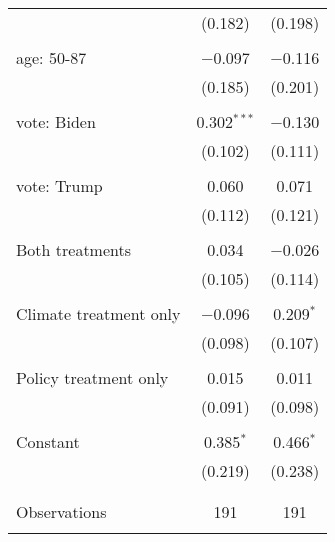 \begin{tabular}{@{\extracolsep{5pt}}lcc}
  & (0.182) & (0.198) \\ 
  & & \\ 
 age: 50-87 & $-$0.097 & $-$0.116 \\ 
  & (0.185) & (0.201) \\ 
  & & \\ 
 vote: Biden & 0.302$^{***}$ & $-$0.130 \\ 
  & (0.102) & (0.111) \\ 
  & & \\ 
 vote: Trump & 0.060 & 0.071 \\ 
  & (0.112) & (0.121) \\ 
  & & \\ 
 Both treatments & 0.034 & $-$0.026 \\ 
  & (0.105) & (0.114) \\ 
  & & \\ 
 Climate treatment only & $-$0.096 & 0.209$^{*}$ \\ 
  & (0.098) & (0.107) \\ 
  & & \\ 
 Policy treatment only & 0.015 & 0.011 \\ 
  & (0.091) & (0.098) \\ 
  & & \\ 
 Constant & 0.385$^{*}$ & 0.466$^{*}$ \\ 
  & (0.219) & (0.238) \\ 
  & & \\ 
\hline \\[-1.8ex] 

Observations & 191 & 191 \\ 
\hline 
\hline \\[-1.8ex] 
\end{tabular} 